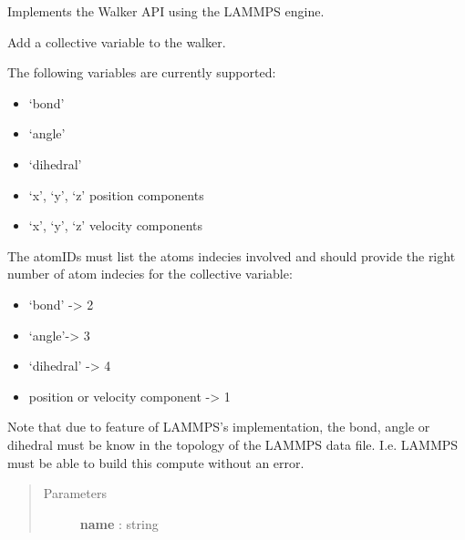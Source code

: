 \documentclass[letterpaper,10pt,english]{sphinxmanual}
\begin{document}
\begin{fulllineitems}
\label{walker_api/walker_api.doc:walker_api.lammps_walker.Lammps}
Implements the Walker API using the LAMMPS engine.

\begin{fulllineitems}
\label{walker_api/walker_api.doc:walker_api.lammps_walker.Lammps.add_colvars}
Add a collective variable to the walker.

The following variables are currently supported:
\begin{itemize}
\item {} 
`bond'

\item {} 
`angle'

\item {} 
`dihedral'

\item {} 
`x', `y', `z' position components

\item {} 
`x', `y', `z' velocity components

\end{itemize}

The atomIDs must list the atoms indecies involved and should provide the right number of atom indecies for the collective variable:
\begin{itemize}
\item {} 
`bond' -\textgreater{} 2

\item {} 
`angle'-\textgreater{} 3

\item {} 
`dihedral' -\textgreater{} 4

\item {} 
position or velocity component -\textgreater{} 1

\end{itemize}

Note that due to feature of LAMMPS's implementation, the bond, angle or dihedral must be know in the topology of the LAMMPS data file. I.e. LAMMPS must be able to build this compute without an error.
\begin{quote}\begin{description}
\item[{Parameters}] \leavevmode
\textbf{name} : string
\begin{quote}


\end{quote}
\end{description}
\end{quote}
\end{fulllineitems}
\end{fulllineitems}
\end{document}
